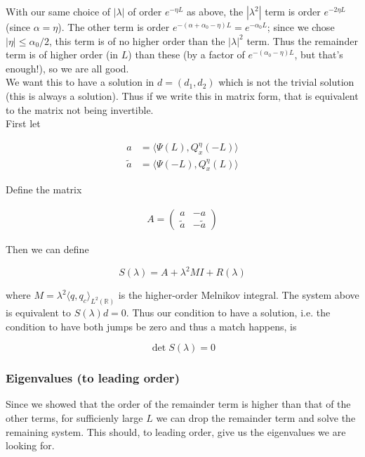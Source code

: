 \documentclass[12pt]{article}
\def\R{{\mathbb R}}
\begin{document}
With our same choice of $|\lambda|$ of order $e^{-\eta L}$ as above, the $|\lambda^2|$ term is order $e^{-2 \eta L}$ (since $\alpha = \eta$). The other term is order $e^{-(\alpha + \alpha_0 - \eta) L} = e^{-\alpha_0 L}$; since we chose $|\eta| \leq \alpha_0 / 2$, this term is of no higher order than the $|\lambda|^2$ term. Thus the remainder term is of higher order (in $L$) than these (by a factor of $e^{-(\alpha_0 - \eta) L}$, but that's enough!), so we are all good.\\

We want this to have a solution in $d = (d_1, d_2)$ which is not the trivial solution (this is always a solution). Thus if we write this in matrix form, that is equivalent to the matrix not being invertible.\\

First let

\begin{align*}
a &= \langle \Psi(L), Q^\eta_x(-L) \rangle \\
\tilde{a} &= \langle \Psi(-L), Q^\eta_x(L) \rangle
\end{align*}

Define the matrix

\begin{align*}
A = \begin{pmatrix}
a & -a \\ \tilde{a} & -\tilde{a} 
\end{pmatrix}
\end{align*}

Then we can define

\[
S(\lambda) = A + \lambda^2 MI + R(\lambda) 
\]

where $M = \lambda^2 \langle q, q_c \rangle_{L^2(\R)}$ is the higher-order Melnikov integral. The system above is equivalent to $S(\lambda)d = 0$. Thus our condition to have a solution, i.e. the condition to have both jumps be zero and thus a match happens, is

\[
\det S(\lambda) = 0
\]

\subsubsection*{Eigenvalues (to leading order)}

Since we showed that the order of the remainder term is higher than that of the other terms, for sufficienly large $L$ we can drop the remainder term and solve the remaining system. This should, to leading order, give us the eigenvalues we are looking for.\\
\end{document}
